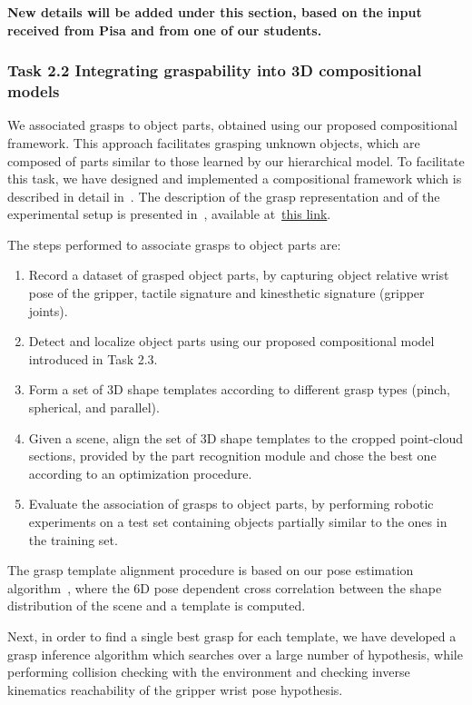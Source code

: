 \documentclass[a4paper,11pt,pdf]{pacmanreport}
\begin{document}
\textbf{New details will be added under this section, based on the input received from Pisa and from one of our students.}

\subsubsection{Task 2.2 Integrating graspability into 3D compositional models}

We associated grasps to object parts, obtained using our proposed compositional framework. This approach facilitates grasping unknown objects, which are composed of parts similar to those learned by our hierarchical model. To facilitate this task, we have designed and implemented a compositional framework which is described in detail in~\cite{Rezapour2015LearningCVPR}. The description of the grasp representation and of the experimental setup is presented in~\cite{Rietzler2015Compositional}, available at~\href{./attachedPapers/rietzeler-techReport.pdf}{this link}.

The steps performed to associate grasps to object parts are:

\begin{enumerate}
\item Record a dataset of grasped object parts, by capturing object relative wrist pose of the gripper, tactile signature and kinesthetic signature (gripper joints).
\item Detect and localize object parts using our proposed compositional model introduced in Task 2.3.
\item Form a set of 3D shape templates according to different grasp types (pinch, spherical, and parallel).
\item Given a scene, align the set of 3D shape templates to the cropped point-cloud sections, provided by the part recognition module and chose the best one according to an optimization procedure.
\item Evaluate the association of grasps to object parts, by performing robotic experiments on a test set containing objects partially similar to the ones in the training set.
\end{enumerate}

The grasp template alignment procedure is based on our pose estimation algorithm~\cite{detry2010ac}, where the 6D pose dependent cross correlation between the shape distribution of the scene and a template is computed. 

Next, in order to find a single best grasp for each template, we have developed a grasp inference algorithm which searches over a large number of hypothesis, while performing collision checking with the environment and checking inverse kinematics reachability of the gripper wrist pose hypothesis.
\end{document}
